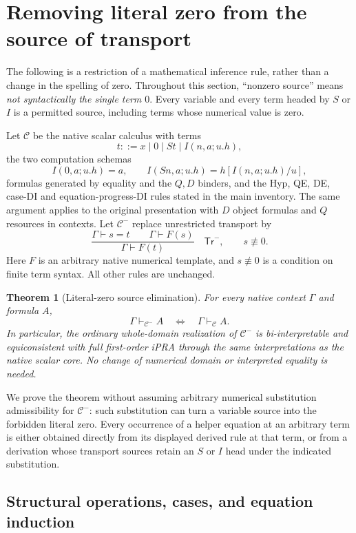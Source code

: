 \documentclass[11pt,a4paper]{article}
\newtheorem{theorem}{Theorem}[section]
\theoremstyle{definition}\newtheorem{definition}[theorem]{Definition}
\begin{document}
\section{Removing literal zero from the source of transport}
\label{zs:section}

The following is a restriction of a mathematical inference rule, rather
than a change in the spelling of zero. Throughout this section,
``nonzero source'' means \emph{not syntactically the single term $0$}.
Every variable and every term headed by $S$ or $I$ is a permitted source,
including terms whose numerical value is zero.

Let $\mathcal C$ be the native scalar calculus with terms
\[
 t::=x\mid0\mid St\mid I(n,a;u.h),
\]
the two computation schemas
\[
 I(0,a;u.h)=a,\qquad
 I(Sn,a;u.h)=h[I(n,a;u.h)/u],
\]
formulas generated by equality and the $Q,D$ binders, and the Hyp, QE,
DE, case-DI and equation-progress-DI rules stated in the main inventory.
The same argument applies to the original presentation with $D$ object
formulas and $Q$ resources in contexts. Let $\mathcal C^{-}$ replace
unrestricted transport by
\[
 \frac{\Gamma\vdash s=t\qquad\Gamma\vdash F(s)}
      {\Gamma\vdash F(t)}
 \quad\mathsf{Tr}^{-},\qquad s\not\equiv0.
 \tag{Tr$^-$}\label{zs:restricted-rule}
\]
Here $F$ is an arbitrary native numerical template, and $s\not\equiv0$
is a condition on finite term syntax. All other rules are unchanged.

\begin{theorem}[Literal-zero source elimination]
\label{zs:main}
For every native context $\Gamma$ and formula $A$,
\[
 \Gamma\vdash_{\mathcal C^{-}}A
 \quad\Longleftrightarrow\quad
 \Gamma\vdash_{\mathcal C}A.
\]
In particular, the ordinary whole-domain realization of
$\mathcal C^{-}$ is bi-interpretable and equiconsistent with full
first-order iPRA through the same interpretations as the native scalar
core. No change of numerical domain or interpreted equality is needed.
\end{theorem}

We prove the theorem without assuming arbitrary numerical substitution
admissibility for $\mathcal C^{-}$: such substitution can turn a variable
source into the forbidden literal zero. Every occurrence of a helper
equation at an arbitrary term is either obtained directly from its
displayed derived rule at that term, or from a derivation whose transport
sources retain an $S$ or $I$ head under the indicated substitution.

\subsection{Structural operations, cases, and equation induction}
\end{document}
